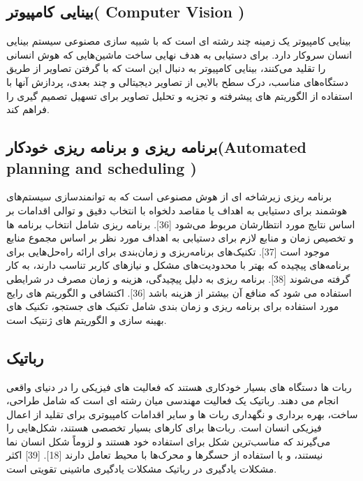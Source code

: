\documentclass[towcolumn, 11pt]{Article}
\begin{document}
\begin{چکیده}
\subsection{بینایی کامپیوتر( Computer Vision )}
بینایی کامپیوتر یک زمینه چند رشته ای است که با شبیه سازی مصنوعی سیستم بینایی انسان سروکار دارد. برای دستیابی به هدف نهایی ساخت ماشین‌هایی که هوش انسانی را تقلید می‌کنند، بینایی کامپیوتر به دنبال این است که با گرفتن تصاویر از طریق دستگاه‌های مناسب، درک سطح بالایی از تصاویر دیجیتالی و چند بعدی، پردازش آنها با استفاده از الگوریتم های پیشرفته و تجزیه و تحلیل تصاویر برای تسهیل تصمیم گیری را فراهم کند.

\subsection{برنامه ریزی و برنامه ریزی خودکار(Automated planning and scheduling )}
برنامه‌ ریزی زیرشاخه‌ ای از هوش مصنوعی است که به توانمندسازی سیستم‌های هوشمند برای دستیابی به اهداف یا مقاصد دلخواه با انتخاب دقیق و توالی اقدامات بر اساس نتایج مورد انتظارشان مربوط می‌شود [36]. برنامه ریزی شامل انتخاب برنامه ها و تخصیص زمان و منابع لازم برای دستیابی به اهداف مورد نظر بر اساس مجموع منابع موجود است [37]. تکنیک‌های برنامه‌ریزی و زمان‌بندی برای ارائه راه‌حل‌هایی برای برنامه‌های پیچیده که بهتر با محدودیت‌های مشکل و نیازهای کاربر تناسب دارند، به کار گرفته می‌شوند [38]. برنامه ریزی به دلیل پیچیدگی، هزینه و زمان مصرف در شرایطی استفاده می شود که منافع آن بیشتر از هزینه باشد [36]. اکتشافی و الگوریتم های رایج مورد استفاده برای برنامه ریزی و زمان بندی شامل تکنیک های جستجو، تکنیک های بهینه سازی و الگوریتم های ژنتیک است.

\subsection{رباتیک}
ربات ها دستگاه های بسیار خودکاری هستند که فعالیت های فیزیکی را در دنیای واقعی انجام می دهند. رباتیک یک فعالیت مهندسی میان رشته ای است که شامل طراحی، ساخت، بهره برداری و نگهداری ربات ها و سایر اقدامات کامپیوتری برای تقلید از اعمال فیزیکی انسان است. ربات‌ها برای کارهای بسیار تخصصی هستند، شکل‌هایی را می‌گیرند که مناسب‌ترین شکل برای استفاده خود هستند و لزوماً شکل انسان‌ نما نیستند، و با استفاده از حسگرها و محرک‌ها با محیط تعامل دارند [18]. [39] اکثر مشکلات یادگیری در رباتیک مشکلات یادگیری ماشینی تقویتی است.


\end{چکیده}
\end{document}
